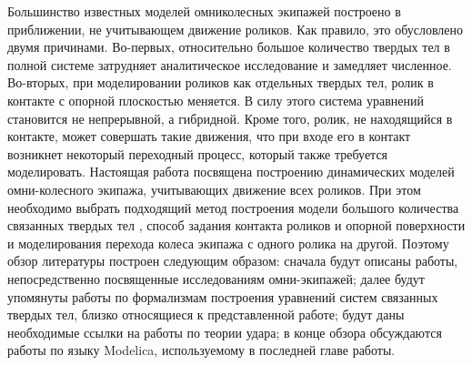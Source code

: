 Большинство известных моделей омниколесных экипажей построено в приближении, не учитывающем движение роликов. Как правило, это обусловлено двумя причинами. Во-первых, относительно большое количество твердых тел в полной системе затрудняет аналитическое исследование и замедляет численное.
Во-вторых, при моделировании роликов как отдельных твердых тел, ролик в контакте с опорной плоскостью меняется. В силу этого система уравнений становится не непрерывной, а гибридной. Кроме того, ролик, не находящийся в контакте, может совершать такие движения, что при входе его в контакт возникнет некоторый переходный процесс, который также требуется моделировать.
Настоящая работа посвящена построению динамических моделей омни-колесного экипажа, учитывающих движение всех роликов.
При этом необходимо выбрать подходящий метод построения модели большого количества связанных твердых тел%
, способ задания контакта роликов и опорной поверхности и моделирования перехода колеса экипажа с одного ролика на другой.
Поэтому обзор литературы построен следующим образом: сначала будут описаны работы, непосредственно посвященные исследованиям омни-экипажей; далее будут упомянуты работы по формализмам построения уравнений систем связанных твердых тел, близко относящиеся к представленной работе; будут даны необходимые ссылки на работы по теории удара; в конце обзора обсуждаются работы по языку Modelica, используемому в последней главе работы.


